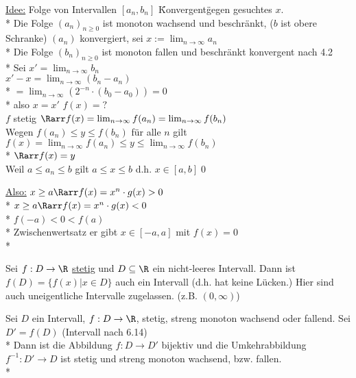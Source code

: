 	\ul{Idee:} Folge von Intervallen $[a_n, b_n]$ \"Konvergent\" gegen gesuchtes $x$.\\*
	Die Folge $(a_n)_{n \geq 0}$ ist monoton wachsend und beschränkt, ($b$ ist obere Schranke) \Rarr $(a_n)$ konvergiert, sei $x:=\lim_{n \to \infty} a_n$\\*
	Die Folge $(b_n)_{n \geq 0}$ ist monoton fallen und beschränkt \Rarr konvergent nach 4.2\\*
	Sei $x' = \lim_{n \to \infty} b_n$\\
	$x' - x = \lim_{n \to \infty} (b_n - a_n)$\\*
	$= \lim_{n \to \infty} (2^{-n} \cdot (b_0 - a_0)) = 0$\\*
	also $x = x'$ $f(x) = ?$\\
	$f$ stetig $\Rarr f(x) = \lim_{n \to \infty} f(a_n) = \lim_{n \to \infty} f(b_n)$\\
	Wegen $f(a_n) \leq y \leq f(b_n)$ für alle $n$ gilt $f(x) = \lim_{n \to \infty} f(a_n) \leq y \leq \lim_{n \to \infty} f(b_n)$\\*
	$\Rarr f(x) = y$\\
\bew
	Weil $a \leq a_n \leq b$ gilt $a \leq x \leq b$ d.h. $x \in [a, b]$\qed\\


\ul{Also:} $x \geq a \Rarr f(x) = x^n \cdot g(x) > 0$\\*
	$x \geq a \Rarr f(x) = x^n \cdot g(x) < 0$\\* %
	$f(-a) < 0 < f(a)$\\*
	Zwischenwertsatz \Rarr er gibt $x \in [-a, a]$ mit $f(x) = 0$\\*

	Sei $f: D \to \R$ \ul{stetig} und $D \subseteq \R$ ein nicht-leeres Intervall. Dann ist $f(D) = \{f(x) | x \in D\}$ auch ein Intervall (d.h. hat keine Lücken.)
\bem
	Hier sind auch uneigentliche Intervalle zugelassen. (z.B. $(0, \infty)$)


	Sei $D$ ein Intervall, $f: D \to \R$, stetig, streng monoton wachsend oder fallend. Sei $D' = f(D)$ (Intervall nach 6.14)\\*
	Dann ist die Abbildung $f: D \to D'$ bijektiv und die Umkehrabbildung $f^{-1}: D' \to D$ ist stetig und streng monoton wachsend, bzw. fallen.\\*

